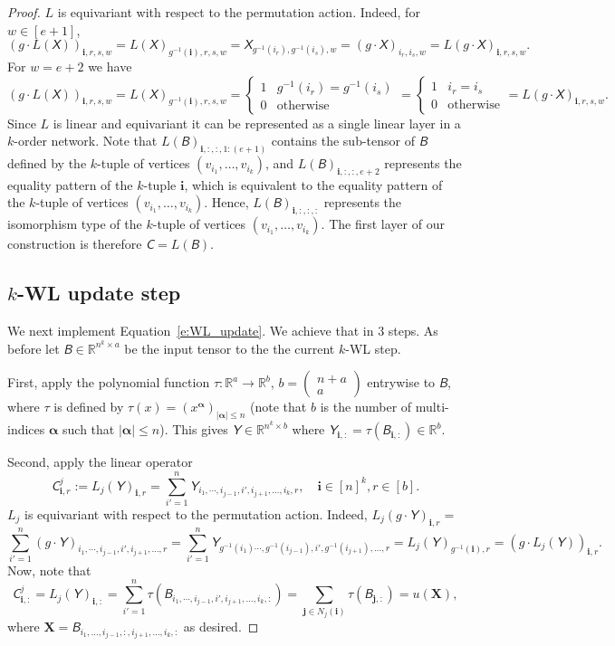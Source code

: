 \documentclass{article}
\newcommand{\abs}[1]{\left\vert#1\right\vert}
\newcommand{\Real}{\mathbb R}
\newcommand{\too}{\rightarrow}
\def\Eqref#1{Equation~\ref{#1}}
\def\vi{{\bm{i}}}
\def\vj{{\bm{j}}}
\def\valpha{{\bm{\alpha}}}
\def\mX{{\bm{X}}}
\newcommand{\tens}[1]{\bm{\mathsfit{#1}}}
\def\tB{{\tens{B}}}
\def\tC{{\tens{C}}}
\def\tX{{\tens{X}}}
\def\tY{{\tens{Y}}}
\begin{document}
\begin{proof}
$L$ is equivariant with respect to the permutation action. Indeed, for $w\in[e+1]$, 
$$(g\cdot L(\tX))_{\vi,r,s,w} = L(\tX)_{g^{-1}(\vi),r,s,w} = \tX_{g^{-1}(i_r),g^{-1}(i_s),w} = (g\cdot \tX)_{i_r,i_s,w}= L(g\cdot \tX)_{\vi,r,s,w}.$$ 
For $w=e+2$ we have 
$$(g\cdot L(\tX))_{\vi,r,s,w} = L(\tX)_{g^{-1}(\vi),r,s,w} =  \begin{cases} 1 & g^{-1}(i_r)=g^{-1}(i_s) \\ 0 & \text{otherwise} \end{cases} = 
\begin{cases} 1 & i_r=i_s \\ 0 & \text{otherwise} \end{cases} = L(g\cdot \tX)_{\vi,r,s,w}.$$
Since $L$ is linear and equivariant it can be represented as a single linear layer in a $k$-order network. Note that $L(\tB)_{\vi,:,:,1:(e+1)}$ contains the sub-tensor of $\tB$ defined by the $k$-tuple of vertices $(v_{i_1},\ldots,v_{i_k})$, and $L(\tB)_{\vi,:,:,e+2}$ represents the equality pattern of the $k$-tuple $\vi$, which is equivalent to the equality pattern of the $k$-tuple of vertices $(v_{i_1},\ldots,v_{i_k})$. Hence, $L(\tB)_{\vi,:,:,:}$ represents the isomorphism type of the $k$-tuple of vertices $(v_{i_1},\ldots,v_{i_k})$. The first layer of our construction is therefore $\tC=L(\tB)$. 



\subsection{$k$-WL update step} \label{sss:update_step}
We next implement \Eqref{e:WL_update}. We achieve that in 3 steps. As before let $\tB\in\Real^{n^k\times a}$ be the input tensor to the the current $k$-WL step.

First, apply the polynomial function $\tau:\Real^{a}\too \Real^b$, $b=\left(\begin{smallmatrix}n+a\\ a\end{smallmatrix}\right)$ entrywise to $\tB$, where $\tau$ is defined by $\tau(x)=(x^\valpha)_{\abs{\valpha}\leq n}$ (note that $b$ is the number of multi-indices $\valpha$ such that $\abs{\valpha}\leq n$). This gives $\tY\in\Real^{n^k\times b}$ where $\tY_{\vi,:}=\tau(\tB_{\vi,:})\in\Real^b$.

Second, apply the linear operator $$\tC^j_{\vi,r} := L_j(\tY)_{\vi,r} = \sum_{i'=1}^n \tY_{i_1,\cdots,i_{j-1},i',i_{j+1},\ldots,i_k,r}, \quad \vi\in [n]^k, r\in [b].$$  
$L_j$ is equivariant with respect to the permutation action. Indeed, 
$L_j(g\cdot \tY)_{\vi,r}=$ $$\sum_{i'=1}^n (g\cdot \tY)_{i_1,\cdots,i_{j-1},i',i_{j+1},\ldots,r}
=\sum_{i'=1}^n \tY_{g^{-1}(i_1)\cdots,g^{-1}(i_{j-1}),i',g^{-1}(i_{j+1}),\ldots,r}=L_j(\tY)_{g^{-1}(\vi),r} = (g\cdot L_j(\tY))_{\vi,r}.$$
Now, note that $$\tC^j_{\vi,:}=L_j(\tY)_{\vi,:}=\sum_{i'=1}^n \tau(\tB_{i_1,\cdots,i_{j-1},i',i_{j+1},\ldots,i_k,:})=\sum_{\vj\in N_j(\vi)} \tau(\tB_{\vj,:})=u(\mX),$$ where $\mX = \tB_{i_1,\ldots,i_{j-1},:,i_{j+1},\ldots,i_k,:}$ as desired. 


\end{proof}
\end{document}
